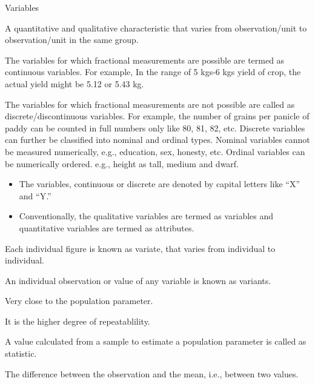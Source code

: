 \documentclass[
  ignorenonframetext,
  aspectratio=169]{beamer}
\providecommand{\tightlist}{%
  \setlength{\itemsep}{0pt}\setlength{\parskip}{0pt}}
\begin{document}
\begin{frame}{Variables}
\protect\hypertarget{variables}{}
\begin{description}
\item[Variables] A quantitative and qualitative characteristic that varies from observation/unit to observation/unit in the same group.
\item[Continuous variables] The variables for which fractional measurements are possible are termed as continuous variables. For example, In the range of 5 kgs-6 kgs yield of crop, the actual yield might be 5.12 or 5.43 kg.
\item[Discrete/Discontinuous variables] The variables for which fractional measurements are not possible are called as discrete/discontinuous variables. For example, the number of grains per panicle of paddy can be counted in full numbers only like 80, 81, 82, etc. Discrete variables can further be classified into nominal and ordinal types. Nominal variables cannot be measured numerically, e.g., education, sex, honesty, etc. Ordinal variables can be numerically ordered. e.g., height as tall, medium and dwarf.
\end{description}

\footnotesize

\begin{itemize}
\tightlist
\item
  The variables, continuous or discrete are denoted by capital letters
  like ``X'' and ``Y.''
\item
  Conventionally, the qualitative variables are termed as variables and
  quantitative variables are termed as attributes.
\end{itemize}
\end{frame}

\begin{frame}{}
\protect\hypertarget{section-6}{}
\begin{description}
\item[Variate] Each individual figure is known as variate, that varies from individual to individual.
\item[Variants] An individual observation or value of any variable is known as variants.
\item[Accurate] Very close to the population parameter.
\item[Precise] It is the higher degree of repeatablility.
\item[Statistic] A value calculated from a sample to estimate a population parameter is called as statistic.
\item[Deviation] The difference between the observation and the mean, i.e., between two values.
\end{description}
\end{frame}
\end{document}
